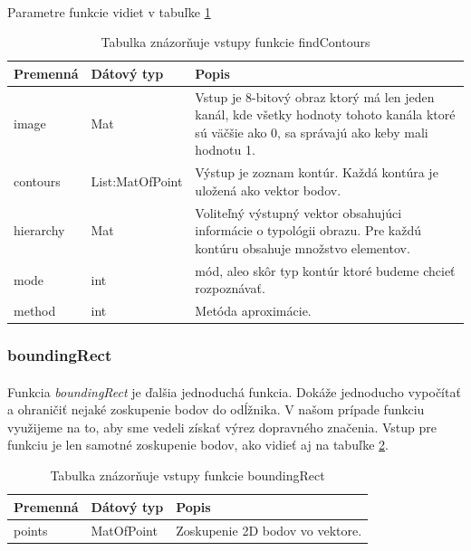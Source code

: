 \documentclass[12pt]{article}
\begin{document}
\paragraph{}
Parametre funkcie vidiet v tabuľke \ref{findContoursPar}
\begin{table}
	\centering
    \begin{tabular}{ | l | l | p{5cm} |}
    \hline
    Premenná & Dátový typ & Popis \\ \hline
    image & Mat & Vstup je 8-bitový obraz ktorý má len jeden kanál, kde všetky hodnoty tohoto kanála ktoré sú väčšie ako 0, sa správajú ako keby mali hodnotu 1. \\ \hline
    contours & List:MatOfPoint & Výstup je zoznam kontúr. Každá kontúra je uložená ako vektor bodov. \\ \hline
    hierarchy & Mat & Voliteľný výstupný vektor obsahujúci informácie o typológii obrazu. Pre každú kontúru obsahuje množstvo elementov. \\ \hline
    mode & int & mód, aleo skôr typ kontúr ktoré budeme chcieť rozpoznávať. \\ \hline
    method & int & Metóda aproximácie. \\
    \hline
    \end{tabular}
  	\caption{Tabulka znázorňuje vstupy funkcie findContours}
  	\label{findContoursPar}
\end{table}
\subsubsection{boundingRect}
\paragraph{}
Funkcia \emph{boundingRect} je ďalšia jednoduchá funkcia. Dokáže jednoducho vypočítať a ohraničiť nejaké zoskupenie bodov do odĺžnika.
V našom prípade funkciu využijeme na to, aby sme vedeli získať výrez dopravného značenia. Vstup pre funkciu je len samotné zoskupenie bodov, ako vidieť aj na tabuľke \ref{boundingRectPar}.
\cite{OpenCVDoc}
\begin{table}
	\centering
    \begin{tabular}{ | l | l | p{5cm} |}
    \hline
    Premenná & Dátový typ & Popis \\ \hline
    points & MatOfPoint & Zoskupenie 2D bodov vo vektore. \\ 
    \hline
    \end{tabular}
  	\caption{Tabulka znázorňuje vstupy funkcie boundingRect}
  	\label{boundingRectPar}
\end{table}
\end{document}
